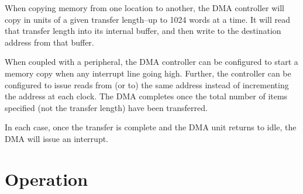 \documentclass{gqtekspec}
\begin{document}
When copying memory from one location to another, the DMA controller will
copy in units of a given transfer length--up to 1024 words at a time.  It will
read that transfer length into its internal buffer, and then write to the
destination address from that buffer.

When coupled with a peripheral, the DMA controller can be configured to start
a memory copy when any interrupt line going high.  Further, the controller can
be configured to issue reads from (or to) the same address instead of
incrementing the address at each clock.  The DMA completes once the total
number of items specified (not the transfer length) have been transferred.

In each case, once the transfer is complete and the DMA unit returns to
idle, the DMA will issue an interrupt.


\chapter{Operation}\label{chap:ops}
\end{document}

